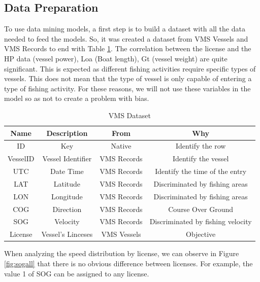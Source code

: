 \subsection{Data Preparation} %
\label{sub:data_preparation}
To use data mining models, a first step is to build a dataset with all the data needed to feed the models. So, it was created a dataset from VMS Vessels and VMS Records to end with Table \ref{table:vms_dataset}. 
The correlation between the license and the HP data (vessel power), Loa (Boat length), Gt (vessel weight) are quite significant. This is expected as different fishing activities require specific types of vessels. This does not mean that the type of vessel is only capable of entering a type of fishing activity.
For these reasons, we will not use these variables in the model so as not to create a problem with bias.

\begin {table}[H]
\caption {VMS Dataset}
\begin{center}
\begin{tabular}{c|c|c|c}
\textbf{Name } & \textbf{Description} & \textbf{From} & \textbf{Why} \\
\hline
ID & Key & Native & Identify the row \\
VesselID & Vessel Identifier & VMS Records & Identify the vessel \\
UTC & Date Time & VMS Records &Identify the time of the entry\\
LAT & Latitude & VMS Records & Discriminated by fishing areas\\
LON & Longitude & VMS Records & Discriminated by fishing areas\\
COG & Direction & VMS Records & Course Over Ground\\
SOG & Velocity & VMS Records & Discriminated by fishing velocity\\
License & Vessel's Linceses & VMS Vessels & Objective
\label{table:vms_dataset}
\end{tabular}
\end{center}
\end {table}



When analyzing the speed distribution by license, we can observe in Figure \ref{fig:sogall} that there is no obvious difference between licenses. For example, the value 1 of SOG can be assigned to any license.

